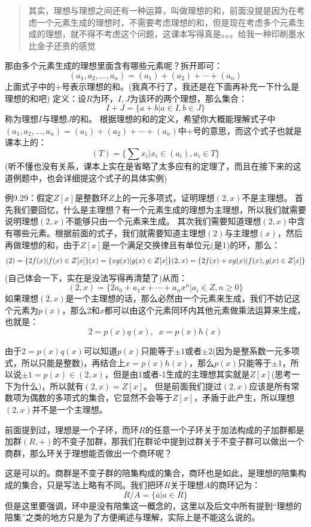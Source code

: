 \documentclass[12pt, a4paper, oneside]{ctexart}
\newenvironment{myquote}{\begin{quote}\small\color{gray}}{\end{quote}}
\begin{document}
\begin{myquote}
其实，理想与理想之间还有一种运算，叫做理想的和，前面没提是因为在考虑一个元素生成的理想时，不需要考虑理想的和，但是现在考虑多个元素生成的理想，就不得不考虑这个问题，这课本写得真是。。。给我一种印刷墨水比金子还贵的感觉
\end{myquote}

那由多个元素生成的理想里面含有哪些元素呢？拆开即可：
\[
(a_1,a_2,...,a_n)=(a_1)+(a_2)+\cdots+(a_n)
\]
上面式子中的+号表示理想的和。(我真不行了，我还是在下面再补充一下什么是理想的和吧)
定义：设$R$为环，$I,J$为该环的两个理想，那么集合：
\[
I+J=\{a+b|a\in I,b\in J\}
\]
称为理想$I$与理想$J$的和。
根据理想的和的定义，希望你大概能理解式子中$(a_1,a_2,...,a_n)=(a_1)+(a_2)+\cdots+(a_n)$中+号的意思，而这个式子也就是课本上的：
\[
(T)=\{\sum x_i|x_i\in (a_i),a_i\in T\}
\]
(听不懂也没有关系，课本上实在是省略了太多应有的定理了，而且在接下来的这道例题中，也会详细提这个式子的具体实例)

例9.29：假定$Z[x]$是整数环$Z$上的一元多项式，证明理想$(2,x)$不是主理想。
首先我们要回忆，什么是主理想？有一个元素生成的理想为主理想，所以我们就需要说明理想$(2,x)$不能够只由一个元素来生成。
其次我们需要知道理想$(2,x)$中含有哪些元素。根据前面的式子，我们就需要知道主理想$(2)$与主理想$(x)$，然后再做理想的和，由于$Z[x]$是一个满足交换律且有单位元(是1)的环，那么：
\[
(2)=\{2f(x)|f(x)\in Z[x]\}\\
(x)=\{xg(x)|g(x)\in Z[x]\}\\
(2,x)=\{2f(x)+xg(x)|f(x),g(x)\in Z[x]\}
\]
(自己体会一下，实在是没法写得再清楚了)从而：
\[
(2,x)=\{2a_0+a_1x+\cdots+a_nx^n|a_i\in Z,n\geqslant0\}
\]
如果理想$(2,x)$是一个主理想的话，那么必然由一个元素来生成，我们不妨记这个元素为$p(x)$，那么2和$x$都可以由这个元素同环内其他元素做乘法运算来生成，也就是：
\[
2=p(x)q(x),\;\; x=p(x)h(x)
\]

由于$2=p(x)q(x)$可以知道$p(x)$只能等于$\pm1$或者$\pm2$(因为是整系数一元多项式，所以只能是整数)，再结合上$x=p(x)h(x)$，那么$p(x)$只能等于$\pm1$，所以说$\pm1=p(x)\in (2,x)$，但是由1或者-1生成的主理想其实就是$Z[x]$(思考一下为什么)，所以就有$(2,x)=Z[x]$。
但是前面我们提过$(2,x)$应该是所有常数项为偶数的多项式的集合，它显然不会等于$Z[x]$，矛盾于此产生，所以理想$(2,x)$并不是一个主理想。

前面提到过，理想是一个子环，而环$R$的任意一个子环关于加法构成的子加群都是加群$(R,+)$的不变子加群，那我们在群论中提到过群关于不变子群可以做出一个商群，那么环关于理想能否做出一个商环呢？

这是可以的。商群是不变子群的陪集构成的集合，商环也是如此，是理想的陪集构成的集合，只是写法上略有不同。我们把环$R$关于理想$A$的商环记为：
\[
R/A=\{\overline{a}|a\in R\}
\]
但是这里要强调，环中是没有陪集这一概念的，这里以及后文中所有提到“理想的陪集”之类的地方只是为了方便阐述与理解，实际上是不能这么说的。
\end{document}
